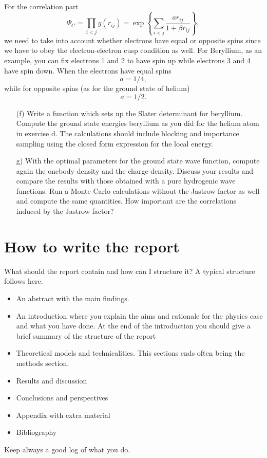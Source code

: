 \documentclass[10pt]{article}
\begin{document}
For the correlation part 
\[
\Psi_C=\prod_{i< j}g(r_{ij})= \exp{\left\{\sum_{i<j}\frac{ar_{ij}}{1+\beta r_{ij}}\right\}},
\]
we need to take into account whether electrons have equal or opposite spins since we have to obey the
electron-electron cusp condition as well.  For Beryllium, as an example,  you can fix electrons 1 and 2 to have spin up while
electrons 3 and 4 have spin down.
When the electrons have  equal spins 
\[
a= 1/4,
\]
while for opposite spins (as for the ground state of  helium)
\[
a= 1/2.
\] 

\begin{enumerate}
\item[(f)]   Write a function which sets up the Slater determinant for beryllium.
Compute the ground state energies beryllium as you did for the helium atom
in exercise d.
The calculations should include  blocking and importance sampling using the closed form expression for the local energy.


\item[g)]  With the optimal parameters for the ground state wave function, compute again the onebody density and 
the charge density. Discuss your results and compare the results with those obtained with a pure hydrogenic wave functions. Run a Monte Carlo calculations without the Jastrow factor as well
and compute the same quantities. How important are the correlations induced by the Jastrow factor?


\end{enumerate}



\section*{How to write the report}
What should the report contain and how can I structure it? A typical structure follows here.
\begin{itemize}
\item An abstract with the main findings.
\item  An introduction where you explain the aims and rationale for the physics case and what you have done. At the end of the introduction you should give a brief summary of the structure of the report
\item Theoretical models and technicalities. This sections ends often being the methods section.
\item Results and discussion
\item Conclusions and perspectives
\item Appendix with extra material
\item Bibliography
\end{itemize}
Keep always a good log of what you do.
\end{document}
